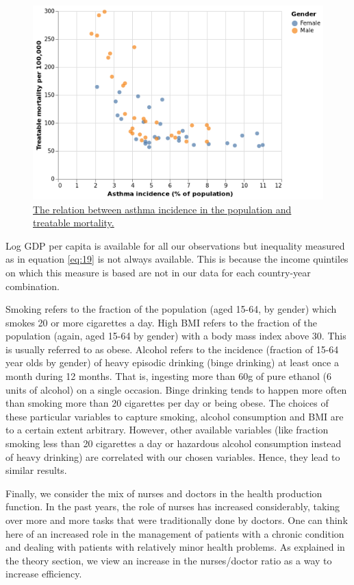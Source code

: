 \documentclass[a4paper,12pt]{article}
\begin{document}
\begin{figure}[htbp]
\centering
\includegraphics[width=.9\linewidth]{./figures/asthma_mortality.png}
\caption{\label{fig:asthma_mortality}\href{https://janboone.github.io/European-Healthcare-Systems/figures/asthma\_mortality.html}{The relation between asthma incidence in the population and treatable mortality.}}
\end{figure}

Log GDP per capita is available for all our observations but inequality measured as in equation \eqref{eq:19} is not always available. This is because the income quintiles on which this measure is based are not in our data for each country-year combination.

Smoking refers to the fraction of the population (aged 15-64, by gender) which smokes 20 or more cigarettes a day. High BMI refers to the fraction of the population (again, aged 15-64 by gender) with a body mass index above 30. This is usually referred to as obese. Alcohol refers to the incidence (fraction of 15-64 year olds by gender) of heavy episodic drinking (binge drinking) at least once a month during 12 months. That is, ingesting more than 60g of pure ethanol (6 units of alcohol) on a single occasion. Binge drinking tends to happen more often than smoking more than 20 cigarettes per day or being obese. The choices of these particular variables to capture smoking, alcohol consumption and BMI are to a certain extent arbitrary. However, other available variables (like fraction smoking less than 20 cigarettes a day or hazardous alcohol consumption instead of heavy drinking) are correlated with our chosen variables. Hence, they lead to similar results.  

Finally, we consider the mix of nurses and doctors in the health production function. In the past years, the role of nurses has increased considerably, taking over more and more tasks that were traditionally done by doctors. One can think here of an increased role in the management of patients with a chronic condition and dealing with patients with relatively minor health problems. As explained in the theory section, we view an increase in the nurses/doctor ratio as a way to increase efficiency.
\end{document}
